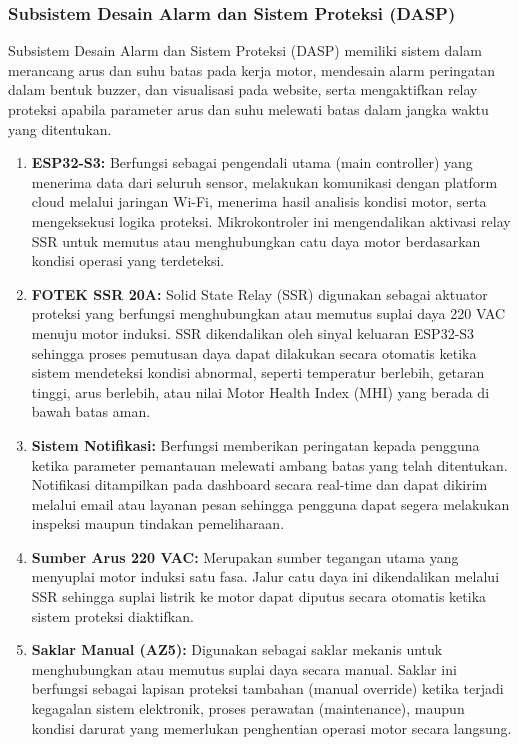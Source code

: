 \documentclass{elsinta}
\begin{document}
\subsubsection{Subsistem Desain Alarm dan Sistem Proteksi (DASP)}
Subsistem Desain Alarm dan Sistem Proteksi (DASP) memiliki sistem dalam merancang arus dan suhu batas pada kerja motor, mendesain alarm peringatan dalam bentuk buzzer, dan visualisasi pada website, serta mengaktifkan relay proteksi apabila parameter arus dan suhu melewati batas dalam jangka waktu yang ditentukan.

\begin{enumerate}
    \item \textbf{ESP32-S3:} Berfungsi sebagai pengendali utama (main controller) yang menerima data dari seluruh sensor, melakukan komunikasi dengan platform cloud melalui jaringan Wi-Fi, menerima hasil analisis kondisi motor, serta mengeksekusi logika proteksi. Mikrokontroler ini mengendalikan aktivasi relay SSR untuk memutus atau menghubungkan catu daya motor berdasarkan kondisi operasi yang terdeteksi.

    \item \textbf{FOTEK SSR 20A:} Solid State Relay (SSR) digunakan sebagai aktuator proteksi yang berfungsi menghubungkan atau memutus suplai daya 220 VAC menuju motor induksi. SSR dikendalikan oleh sinyal keluaran ESP32-S3 sehingga proses pemutusan daya dapat dilakukan secara otomatis ketika sistem mendeteksi kondisi abnormal, seperti temperatur berlebih, getaran tinggi, arus berlebih, atau nilai Motor Health Index (MHI) yang berada di bawah batas aman.

    \item \textbf{Sistem Notifikasi:} Berfungsi memberikan peringatan kepada pengguna ketika parameter pemantauan melewati ambang batas yang telah ditentukan. Notifikasi ditampilkan pada dashboard secara real-time dan dapat dikirim melalui email atau layanan pesan sehingga pengguna dapat segera melakukan inspeksi maupun tindakan pemeliharaan.

    \item \textbf{Sumber Arus 220 VAC:} Merupakan sumber tegangan utama yang menyuplai motor induksi satu fasa. Jalur catu daya ini dikendalikan melalui SSR sehingga suplai listrik ke motor dapat diputus secara otomatis ketika sistem proteksi diaktifkan.

    \item \textbf{Saklar Manual (AZ5):} Digunakan sebagai saklar mekanis untuk menghubungkan atau memutus suplai daya secara manual. Saklar ini berfungsi sebagai lapisan proteksi tambahan (manual override) ketika terjadi kegagalan sistem elektronik, proses perawatan (maintenance), maupun kondisi darurat yang memerlukan penghentian operasi motor secara langsung.
\end{enumerate}
\end{document}
